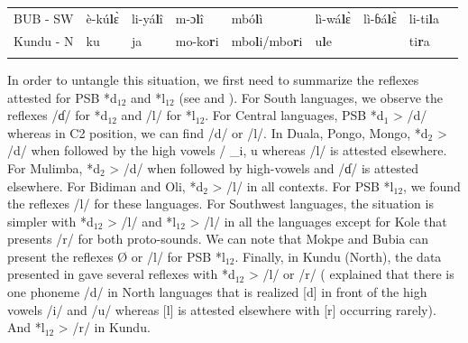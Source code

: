 \documentclass[output=paper,colorlinks,citecolor=brown
]{langscibook}
\begin{document}
\begin{table}
{\begin{tabular}{lllllllll}
BUB - SW                  & è-kú\textbf{l}ɛ̀                & li-yá\textbf{l}î                 & m-ɔ\textbf{l}î                 & mbó\textbf{l}ì                & lì-wá\textbf{l}ɛ̀                   & lì-ɓá\textbf{l}ɛ̀             & li-ti\textbf{l}a                 &                         \\
Kundu - N                 & ku                       & ja                      & mo-ko\textbf{r}i                & mbo\textbf{l}i/mbo\textbf{r}i            & u\textbf{l}e                          &                        & ti\textbf{r}a                    &              \\ 
   \lspbottomrule
 \end{tabular}
 }
\end{table}

In order to untangle this situation, we first need to summarize the reflexes attested for PSB *d$_{12}$ and *l$_{12}$ (see  and ). For South languages, we observe the reflexes /ɗ/ for *d$_{12}$ and /l/ for *l$_{12}$. For Central languages, PSB *d$_1$ > /d/ whereas in C2 position, we can find /d/ or /l/. In Duala, Pongo, Mongo, *d$_2$ > /d/ when followed by the high vowels / \_i, u whereas /l/ is attested elsewhere. For Mulimba, *d$_2$ > /d/ when followed by high-vowels and /ɗ/ is attested elsewhere. For Bidiman and Oli, *d$_2$ > /l/ in all contexts. For PSB *l$_{12}$, we found the reflexes /l/ for these languages. For Southwest languages, the situation is simpler with *d$_{12}$ > /l/ and *l$_{12}$ > /l/ in all the languages except for Kole that presents /r/ for both proto-sounds. We can note that Mokpe and Bubia can present the reflexes Ø or /l/ for PSB *l$_{12}$. Finally, in Kundu (North), the data presented in \cite[24]{friesen2002} gave several reflexes with *d$_{12}$ > /l/ or /r/ (\citealt[25-27]{friesen2002} explained that there is one phoneme /d/ in North languages that is realized [d] in front of the high vowels /i/ and /u/ whereas [l] is attested elsewhere with [r] occurring rarely). And *l$_{12}$ > /r/ in Kundu. 
\end{document}
